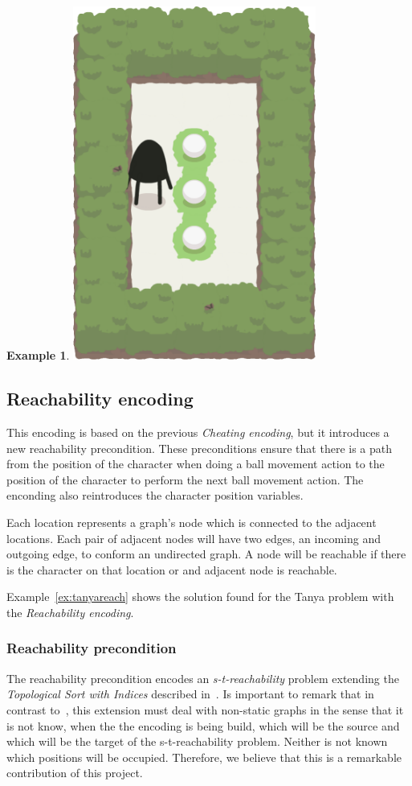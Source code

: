 \documentclass{report}
\theoremstyle{plain}
\newtheorem{example}{Example}[section]
\begin{document}
\begin{example}
\begin{minipage}{0.5\textwidth}
\includegraphics[width=0.6\textwidth]{tanya-1.png}
\end{minipage}
\end{example}

\subsection{Reachability encoding}
This encoding is based on the previous \emph{Cheating encoding}, but it introduces a new reachability precondition. These preconditions ensure that there is a path from the position of the character when doing a ball movement action to the position of the character to perform the next ball movement action. The enconding also reintroduces the character position variables.

Each location represents a graph's node which is connected to the adjacent locations. Each pair of adjacent nodes will have two edges, an incoming and outgoing edge, to conform an undirected graph. A node will be reachable if there is the character on that location or and adjacent node is reachable.

Example~\ref{ex:tanyareach} shows the solution found for the Tanya problem with the \emph{Reachability encoding}.

\subsubsection{Reachability precondition}
The reachability precondition encodes an \emph{s-t-reachability} problem extending the \emph{Topological Sort with Indices} described in~\cite{gebser}. Is important to remark that in contrast to~\cite{gebser}, this extension must deal with non-static graphs in the sense that it is not know, when the the encoding is being build, which will be the source and which will be the target of the s-t-reachability problem. Neither is not known which positions will be occupied. Therefore, we believe that this is a remarkable contribution of this project.
\end{document}

